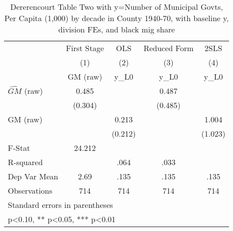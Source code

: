 \begin{table}[htbp]\centering
\def\sym#1{\ifmmode^{#1}\else\(^{#1}\)\fi}
\caption{Dererencourt Table Two with y=Number of Municipal Govts, Per Capita (1,000) by decade in County 1940-70, with baseline y, division FEs, and black mig share}
\begin{tabular}{l*{4}{c}}
\toprule
                    & First Stage   &         OLS   &Reduced Form   &        2SLS   \\
                    &\multicolumn{1}{c}{(1)}&\multicolumn{1}{c}{(2)}&\multicolumn{1}{c}{(3)}&\multicolumn{1}{c}{(4)}\\
                    &\multicolumn{1}{c}{GM  (raw)}&\multicolumn{1}{c}{y\_L0}&\multicolumn{1}{c}{y\_L0}&\multicolumn{1}{c}{y\_L0}\\
\midrule
$\hat{GM}$ (raw)    &       0.485   &               &       0.487   &               \\
                    &     (0.304)   &               &     (0.485)   &               \\
\addlinespace
GM  (raw)           &               &       0.213   &               &       1.004   \\
                    &               &     (0.212)   &               &     (1.023)   \\
\midrule
F-Stat              &      24.212   &               &               &               \\
R-squared           &               &        .064   &        .033   &               \\
Dep Var Mean        &        2.69   &        .135   &        .135   &        .135   \\
Observations        &         714   &         714   &         714   &         714   \\
\bottomrule
\multicolumn{5}{l}{\footnotesize Standard errors in parentheses}\\
\multicolumn{5}{l}{\footnotesize * p<0.10, ** p<0.05, *** p<0.01}\\
\end{tabular}
\end{table}

